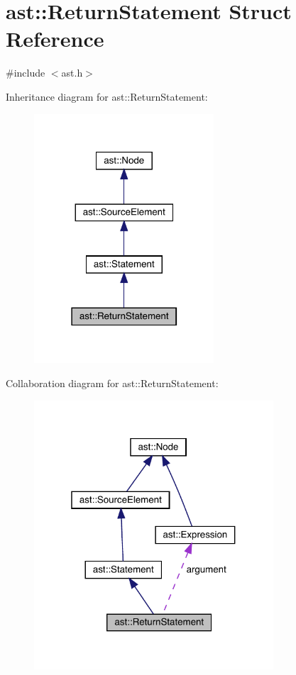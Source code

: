 \hypertarget{structast_1_1_return_statement}{}\section{ast\+:\+:Return\+Statement Struct Reference}
\label{structast_1_1_return_statement}


{\ttfamily \#include $<$ast.\+h$>$}



Inheritance diagram for ast\+:\+:Return\+Statement\+:\nopagebreak
\begin{figure}[H]
\begin{center}
\leavevmode
\includegraphics[width=190pt]{structast_1_1_return_statement__inherit__graph}
\end{center}
\end{figure}


Collaboration diagram for ast\+:\+:Return\+Statement\+:\nopagebreak
\begin{figure}[H]
\begin{center}
\leavevmode
\includegraphics[width=253pt]{structast_1_1_return_statement__coll__graph}
\end{center}
\end{figure}
